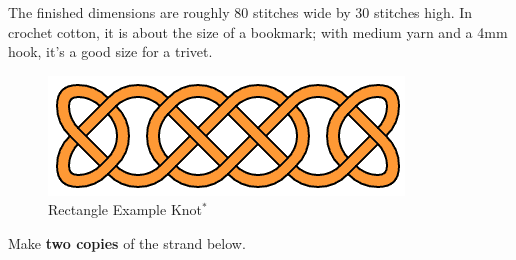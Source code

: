 \documentclass[openany]{book}
\newcommand{\gen}{\hyperref[generated]{$^*$}}%
\newcommand{\ch}{}%
\renewcommand{\sc}{}%
\newcommand{\RK}{Rectangle Example Knot}
\newcommand{\m}[1]{$\stackrel{{\text{#1}}}{/}$}
\begin{document}
The finished dimensions are roughly 80 stitches wide by 30 stitches high. In crochet cotton, it is about the size of a bookmark; with medium yarn and a 4mm hook, it's a good size for a trivet.
\begin{figure}[H]
\centering
\includegraphics{rectangle}
\caption[\RK]{\RK\gen}
\label{fig:gen1}
\end{figure}
Make \textbf{two copies} of the strand below. 
%
\end{document}
